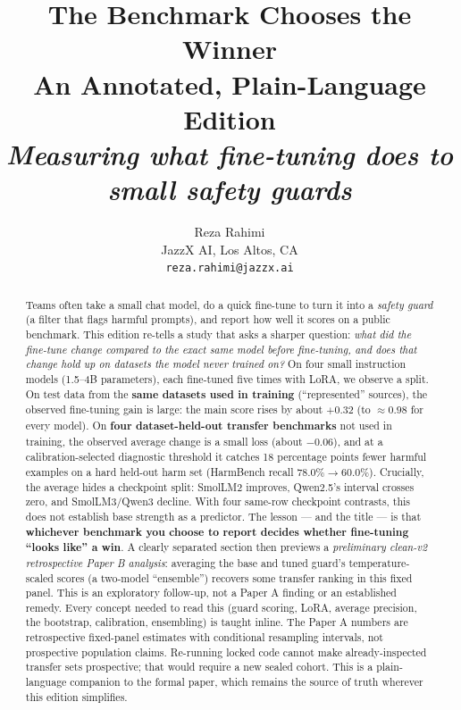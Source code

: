 \documentclass[11pt]{article}
\title{\textbf{The Benchmark Chooses the Winner}\\[2pt]
\large An Annotated, Plain-Language Edition\\[2pt]
\normalsize\itshape Measuring what fine-tuning does to small safety guards}
\author{Reza Rahimi \\ \small JazzX AI, Los Altos, CA \\ \small\texttt{reza.rahimi@jazzx.ai}}
\date{}
\begin{document}
\maketitle

\begin{abstract}
\noindent
Teams often take a small chat model, do a quick fine-tune to turn it into a
\emph{safety guard} (a filter that flags harmful prompts), and report how well it scores
on a public benchmark. This edition re-tells a study that asks a sharper question:
\emph{what did the fine-tune change compared to the exact same model before fine-tuning,
and does that change hold up on datasets the model never trained on?} On four small
instruction models (1.5--4B parameters), each fine-tuned five times with LoRA, we observe a
split. On test data from the \textbf{same datasets used in training} (``represented''
sources), the observed fine-tuning gain is large: the main score rises by about
\textbf{$+0.32$} (to $\approx0.98$ for every model). On \textbf{four dataset-held-out
transfer benchmarks} not used in training, the observed average change is a small loss
(about \textbf{$-0.06$}), and at a calibration-selected diagnostic threshold it catches
18 percentage points fewer harmful examples on a hard
held-out harm set (HarmBench recall $78.0\%\!\to\!60.0\%$). Crucially, the average hides a
checkpoint split: SmolLM2 improves, Qwen2.5's interval crosses zero, and SmolLM3/Qwen3 decline.
With four same-row checkpoint contrasts, this does not establish base strength as a predictor. The
lesson --- and the title --- is that \textbf{whichever benchmark you choose to report decides
whether fine-tuning ``looks like'' a win}. A clearly separated section then previews a
\emph{preliminary clean-v2 retrospective Paper B analysis}: averaging the base and tuned guard's temperature-scaled
scores (a two-model ``ensemble'') recovers some transfer ranking in this fixed panel. This is
an exploratory follow-up, not a Paper A finding or an established remedy. Every concept
needed to read this (guard scoring, LoRA, average precision, the bootstrap, calibration,
ensembling) is taught inline. The Paper A numbers are retrospective fixed-panel estimates with
conditional resampling intervals, not prospective population claims. Re-running locked code
cannot make already-inspected transfer sets prospective; that would require a new sealed
cohort. This is a plain-language companion to the formal paper, which remains the source
of truth wherever this edition simplifies.
\end{abstract}
\end{document}
